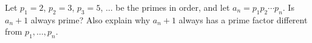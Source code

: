 Let $p_1=2$, $p_2=3$, $p_3=5$, $\dots$ be the primes in order, and let $a_n=p_1p_2\cdots p_n$. Is $a_n+1$ always prime? Also explain why $a_n+1$ always has a prime factor different from $p_1,\dots,p_n$.
